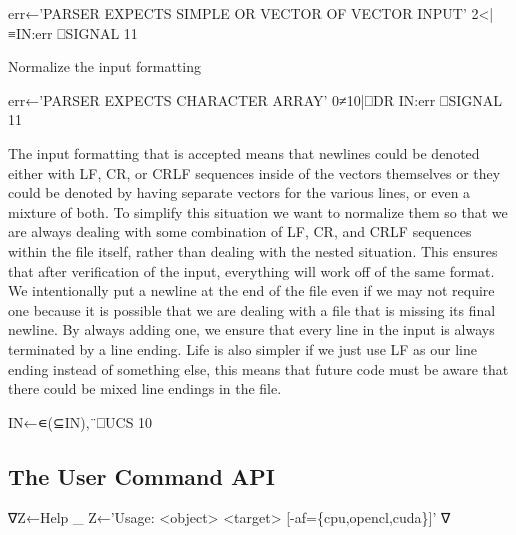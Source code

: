 \documentclass{article}%
\begin{document}
err←'PARSER EXPECTS SIMPLE OR VECTOR OF VECTOR INPUT'
2<|≡IN:err ⎕SIGNAL 11

\LA{}Normalize the input formatting~{\nwtagstyle{}}\RA{}

err←'PARSER EXPECTS CHARACTER ARRAY'
0≠10|⎕DR IN:err ⎕SIGNAL 11
\nwendcode{}\nwdocspar

The input formatting that is accepted means that newlines could be
denoted either with {\Tt{}LF\nwendquote}, {\Tt{}CR\nwendquote}, or {\Tt{}CRLF\nwendquote}
sequences inside of the vectors
themselves or they could be denoted by having separate vectors
for the various lines,
or even a mixture of both.
To simplify this situation we want to normalize them so that we are
always dealing with some combination of {\Tt{}LF\nwendquote}, {\Tt{}CR\nwendquote}, and {\Tt{}CRLF\nwendquote}
sequences
within the file itself, rather than dealing with the nested
situation.
This ensures that after verification of the input,
everything will work off of the same format.
We intentionally put a newline at the end of the file even if we
may not require one because it is possible that we are dealing
with a file that is missing its final newline.
By always adding one, we ensure that every line in the input
is always terminated by a line ending.
Life is also simpler if we just use LF as our line ending instead
of something else,
this means that future code must be aware that there could be mixed
line endings in the file.

\nwenddocs{}\endmoddef\nwstartdeflinemarkup{}\nwenddeflinemarkup
IN←∊(⊆IN),¨⎕UCS 10
\nwendcode{}\nwdocspar

\subsection{The User Command API}

\nwenddocs{}\endmoddef\nwstartdeflinemarkup{}\nwenddeflinemarkup
∇Z←Help _
 Z←'Usage: <object> <target> [-af=\{cpu,opencl,cuda\}]'
∇
\end{document}
